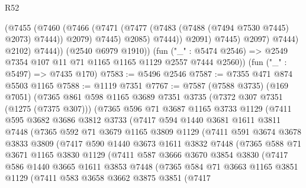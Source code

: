 \begin{lexlean}{R52}
\begin{coremodule}
                        (@7455
                          (@7460
                            (@7466
                              (@7471 (@7477 (@7483 (@7488 (@7494 @7530 @7445) @2073) @7444)) @2079)
                              @7445)
                            @2085)
                          @7444))
                      @2091)
                    @7445)
                  @2097)
                @7444)
              @2102)
            @7444))
        (@2540 @6979 @1910))
      (fun ("_" : @5474 @2546) => @2549 @7354 @107 @11 @71 @1165 @1165 @1129 @2557 @7444 @2560))
    (fun ("_" : @5497) => @7435 @170)
@7583 := @5496 @2546
@7587 := @7355 @471 @874 @5503 @1165
@7588 := @1119 @7351
@7767 := @7587
    (@7588 @3735)
    (@169 @7051)
    (@7365
      @861
      @598
      @1165
      @3689
      @7351
      @3735
      (@7372 @307 @7351 (@1275 (@7375 @307)))
      (@7365
        @596
        @71
        @3687
        @1165
        @3733
        @1129
        (@7411
          @595
          @3682
          @3686
          @3812
          @3733
          (@7417
            @594
            @1440
            @3681
            @1611
            @3811
            @7448
            (@7365
              @592
              @71
              @3679
              @1165
              @3809
              @1129
              (@7411
                @591
                @3674
                @3678
                @3833
                @3809
                (@7417
                  @590
                  @1440
                  @3673
                  @1611
                  @3832
                  @7448
                  (@7365
                    @588
                    @71
                    @3671
                    @1165
                    @3830
                    @1129
                    (@7411
                      @587
                      @3666
                      @3670
                      @3854
                      @3830
                      (@7417
                        @586
                        @1440
                        @3665
                        @1611
                        @3853
                        @7448
                        (@7365
                          @584
                          @71
                          @3663
                          @1165
                          @3851
                          @1129
                          (@7411
                            @583
                            @3658
                            @3662
                            @3875
                            @3851
                            (@7417

\end{coremodule}
\end{lexlean}
